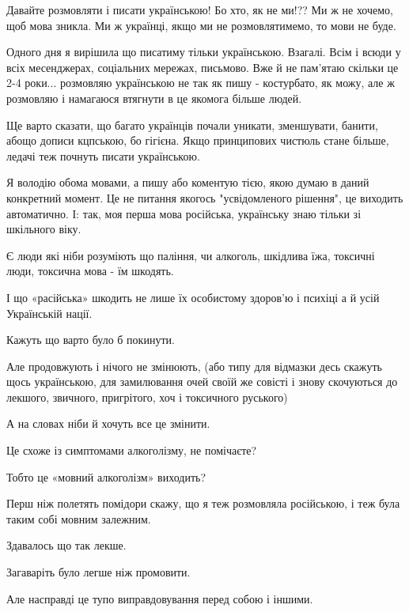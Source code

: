 \begin{itemize}

Давайте розмовляти і писати українською! Бо хто, як не ми!?? Ми ж не хочемо,
щоб мова зникла. Ми ж українці, якщо ми не розмовлятимемо, то мови не буде.


Одного дня я вирішила що писатиму тільки українською. Взагалі. Всім і всюди у
всіх месенджерах, соціальних мережах, письмово. Вже й не пам'ятаю скільки це
2-4 роки... розмовляю українською не так як пишу - костурбато, як можу, але ж
розмовляю і намагаюся втягнути в це якомога більше людей.


Ще варто сказати, що багато українців почали уникати, зменшувати, банити, абощо
дописи кцпською, бо гігієна. Якщо принципових чистюль стане більше, ледачі теж
почнуть писати українською.


Я володію обома мовами, а пишу або коментую тією, якою думаю в даний конкретний
момент. Це не питання якогось "усвідомленого рішення", це виходить автоматично.
І: так, моя перша мова російська, українську знаю тільки зі шкільного віку.


Є люди які ніби розуміють що паління, чи алкоголь, шкідлива їжа, токсичні люди,
токсична мова - їм шкодять.

І що «расійська» шкодить не лише їх особистому здоров’ю і психіці а й усій
Українській нації.

Кажуть що варто було б покинути.

Але продовжують і нічого не змінюють, (або типу для відмазки десь скажуть щось
українською, для замилювання очей своїй же совісті і знову скочуються до
лекшого, звичного, пригрітого, хоч і токсичного руського)

А на словах ніби й хочуть все це змінити.

Це схоже із симптомами алкоголізму, не помічаєте?

Тобто це «мовний алкоголізм» виходить?

Перш ніж полетять помідори скажу, що я теж розмовляла російською, і теж була
таким собі мовним залежним.

Здавалось що так лекше.

Загаваріть було легше ніж промовити.

Але насправді це тупо виправдовування перед собою і іншими.


\end{itemize}
